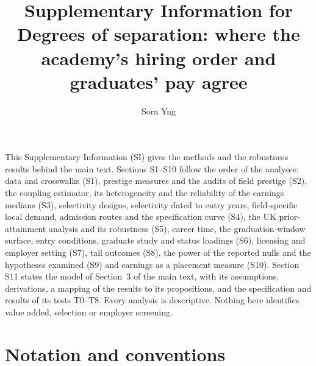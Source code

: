 \documentclass[11pt]{article}
\title{Supplementary Information for\\[4pt]
\large Degrees of separation: where the academy's hiring order and graduates' pay agree}
\author{Sora Yng}
\date{}
\begin{document}
\maketitle

\noindent This Supplementary Information (SI) gives the methods and the robustness results behind the
main text. Sections S1--S10 follow the order of the analyses: data and crosswalks (S1), prestige measures and the
audits of field prestige (S2), the coupling estimator, its heterogeneity and the reliability of the earnings medians (S3), selectivity
designs, selectivity dated to entry years, field-specific local demand, admission routes and the specification
curve (S4), the UK prior-attainment analysis and its robustness (S5), career time, the graduation-window surface,
entry conditions, graduate study and status loadings (S6), licensing and employer setting (S7), tail outcomes
(S8), the power of the reported nulls and the hypotheses examined (S9) and earnings as a placement measure (S10).
Section S11 states the model of Section~3 of the main text, with its assumptions, derivations, a mapping of the
results to its propositions, and the specification and results of its tests T0--T8. Every analysis is
descriptive. Nothing here identifies value added, selection or employer screening.

\tableofcontents
\bigskip

\section*{Notation and conventions}
\end{document}
